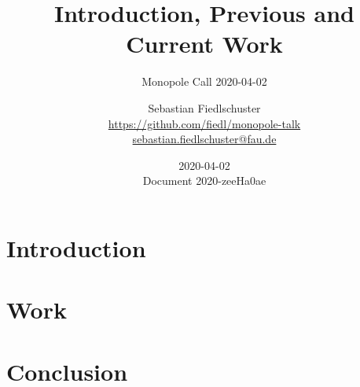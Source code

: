 \documentclass[green, 12pt]{beamer}
\title[Current Work, \url{https://github.com/fiedl/monopole-talk}]{Introduction, Previous and Current Work}
\subtitle{Monopole Call 2020-04-02}
\date{2020-04-02 \\ \vspace*{2mm} \tiny{Document 2020-zeeHa0ae} \normalsize}
\author[Sebastian Fiedlschuster]{Sebastian Fiedlschuster \\ \small\url{https://github.com/fiedl/monopole-talk} \\
\small\url{sebastian.fiedlschuster@fau.de}}
\institute{Erlangen Centre for Astroparticle Physics}
\newif\ifplacelogo %
\begin{document}



\placelogofalse

\section{Introduction}
%


\section{Work}


\section{Conclusion}


\end{document}
